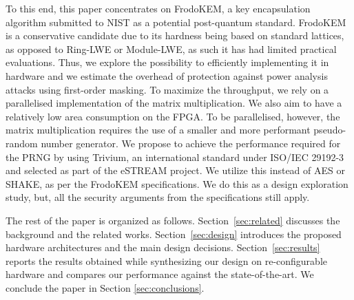 To this end, this paper concentrates on FrodoKEM, a key encapsulation algorithm submitted to NIST as a potential post-quantum standard. FrodoKEM is a conservative candidate due to its hardness being based on standard lattices, as opposed to Ring-LWE or Module-LWE, as such it has had limited practical evaluations. Thus, we explore the possibility to efficiently implementing it in hardware and we estimate the overhead of protection against power analysis attacks using first-order masking. To maximize the throughput, we rely on a parallelised implementation of the matrix multiplication. We also aim to have a relatively low area consumption on the FPGA. To be parallelised, however, the matrix multiplication requires the use of a smaller and more performant pseudo-random number generator. We propose to achieve the performance required for the PRNG by using Trivium, an international standard under ISO/IEC 29192-3 \cite{ISO} and selected as part of the eSTREAM project. We utilize this instead of AES or SHAKE, as per the FrodoKEM specifications. We do this as a design exploration study, but, all the security arguments from the specifications still apply.

The rest of the paper is organized as follows. Section~\ref{sec:related} discusses the background and the related works. Section~\ref{sec:design} introduces the proposed hardware architectures and the main design decisions. Section~\ref{sec:results} reports the results obtained while synthesizing our design on re-configurable hardware and compares our performance against the state-of-the-art. We conclude the paper in Section \ref{sec:conclusions}.